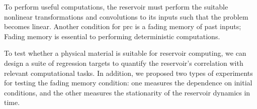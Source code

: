 To perform useful computations, the reservoir must perform the suitable nonlinear transformations and convolutions to its inputs such that the problem becomes linear.
Another condition for \acrshort{prc} is a fading memory of past inputs; Fading memory is essential to performing deterministic computations.

To test whether a physical material is suitable for reservoir computing, we can design a suite of regression targets to quantify the reservoir's correlation with relevant computational tasks.
In addition, we proposed two types of experiments for testing the fading memory condition: one measures the dependence on initial conditions, and the other measures the stationarity of the reservoir dynamics in time.